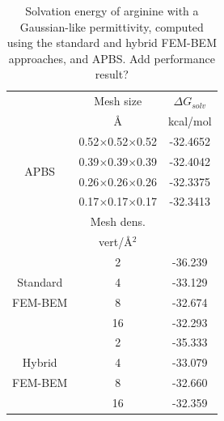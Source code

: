 \begin{table}
\centering
\begin{tabular}{c|c|c}
&Mesh size & $\Delta G_{solv}$\\
&\AA       &  kcal/mol \\
\hline
\multirow{4}{*}{APBS}& 0.52$\times$0.52$\times$0.52 & -32.4652\\ 
& 0.39$\times$0.39$\times$0.39 & -32.4042\\ 
&0.26$\times$0.26$\times$0.26 & -32.3375\\ 
&0.17$\times$0.17$\times$0.17 & -32.3413\\ 
\hline
&Mesh dens. & \\
&vert/\AA$^2$ & \\
\hline
    & 2 & -36.239\\
Standard    & 4  & -33.129 \\
FEM-BEM    & 8  & -32.674 \\
    & 16 & -32.293 \\
\hline
    & 2 & -35.333\\
Hybrid    & 4  & -33.079 \\
FEM-BEM    & 8  & -32.660 \\
    & 16 & -32.359 \\
\hline
\end{tabular}
\caption{Solvation energy of arginine with a Gaussian-like permittivity, computed using the standard and hybrid FEM-BEM approaches, and APBS. Add performance result?}
\label{table:arg_variable}
\end{table}

